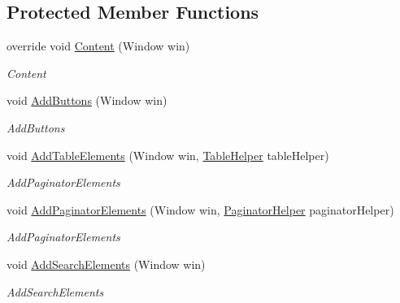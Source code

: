\subsection*{Protected Member Functions}
\begin{DoxyCompactItemize}
\item 
override void \mbox{\hyperlink{class_gtd_app_1_1_console_1_1_views_1_1_notifications_1_1_list_notifications_view_a81f1e9ff319de52b7cb8d945673540ee}{Content}} (Window win)
\begin{DoxyCompactList}\small\item\em Content \end{DoxyCompactList}\item 
void \mbox{\hyperlink{class_gtd_app_1_1_console_1_1_views_1_1_notifications_1_1_list_notifications_view_a00c45407087eb2eecb19ffdabae76727}{Add\+Buttons}} (Window win)
\begin{DoxyCompactList}\small\item\em Add\+Buttons \end{DoxyCompactList}\item 
void \mbox{\hyperlink{class_gtd_app_1_1_console_1_1_views_1_1_notifications_1_1_list_notifications_view_a11ffe8e23262017a7a0cf45a222d398a}{Add\+Table\+Elements}} (Window win, \mbox{\hyperlink{class_gtd_app_1_1_console_core_1_1_views_1_1_helpers_1_1_table_helper}{Table\+Helper}} table\+Helper)
\begin{DoxyCompactList}\small\item\em Add\+Paginator\+Elements \end{DoxyCompactList}\item 
void \mbox{\hyperlink{class_gtd_app_1_1_console_1_1_views_1_1_notifications_1_1_list_notifications_view_abe718dad9ddfb6c9db05dd5fe99db00e}{Add\+Paginator\+Elements}} (Window win, \mbox{\hyperlink{class_gtd_app_1_1_console_core_1_1_views_1_1_helpers_1_1_paginator_helper}{Paginator\+Helper}} paginator\+Helper)
\begin{DoxyCompactList}\small\item\em Add\+Paginator\+Elements \end{DoxyCompactList}\item 
void \mbox{\hyperlink{class_gtd_app_1_1_console_1_1_views_1_1_notifications_1_1_list_notifications_view_a9282b5c50f46f8a501f05420b8920e9e}{Add\+Search\+Elements}} (Window win)
\begin{DoxyCompactList}\small\item\em Add\+Search\+Elements \end{DoxyCompactList}\item 

\end{DoxyCompactItemize}
